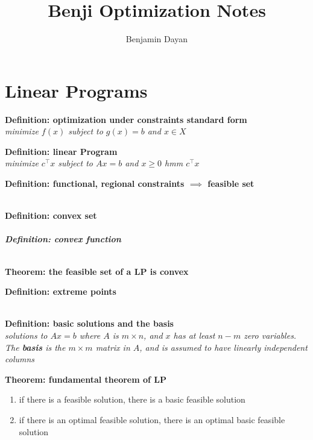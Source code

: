 \documentclass{tufte-handout}
\title{Benji Optimization Notes}
\author{Benjamin Dayan}
\newenvironment{defi}[1]
{\noindent \textbf{Definition: #1}\\
\itshape \noindent}
{\\}
\newenvironment{thm}[1]
{\noindent \textbf{Theorem: #1}\\
	\itshape \noindent}
{\newline}
\begin{document}
	
	\maketitle
	
	\section{Linear Programs}
	\begin{defi}{optimization under constraints standard form}
		minimize $f(x)$ subject to $g(x) = b$ and $x \in X$
	\end{defi}
	
	\begin{defi}{linear Program}
		minimize $c^\intercal x$ subject to $Ax = b$ and $x \geq 0$ hmm $c^\intercal x$
	\end{defi}

	\begin{defi}{functional, regional constraints $\implies$ feasible set}
	\end{defi}
	
	
	\begin{defi}{convex set}
	\end{defi}
	\begin{defi}{convex function}
	\end{defi}

	\begin{thm}{the feasible set of a LP is convex}
	\end{thm}

	\begin{defi}{extreme points}\end{defi}
	
	\begin{defi}{basic solutions and the basis}
		solutions to $Ax = b$ where $A$ is $m \times n$, and $x$ has at least $n-m$ zero variables. The \textbf{basis} is the $m \times m$ matrix in $A$, and is assumed to have linearly independent columns
	\end{defi}

	\begin{thm}{fundamental theorem of LP}
		\begin{enumerate}
			\item if there is a feasible solution, there is a basic feasible solution
			\item if there is an optimal feasible solution, there is an optimal basic feasible solution
		\end{enumerate}
	\end{thm}
\end{document}
